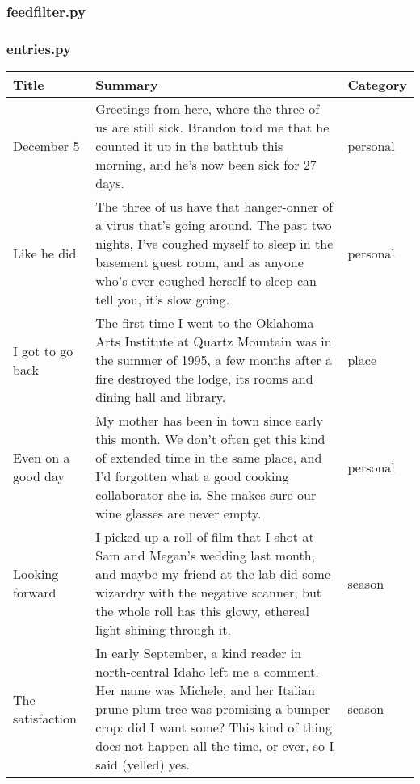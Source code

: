 \documentclass[12pt]{article}
\begin{document}
\subsubsection{feedfilter.py}

\newpage
\subsubsection{entries.py}


\newpage

\begin{longtable}{ | p{3.0cm} | p{12.0cm} |p{2.0cm}| }\hline
\textbf{Title} & \textbf{Summary} & \textbf{Category} \\\hline
 December 5 & Greetings from here, where the three of us are still sick.  Brandon told me that he counted it up in the bathtub this morning, and he’s now been sick for 27 days. & personal\\\hline
 
Like he did & The three of us have that hanger-onner of a virus that’s going around. The past two nights, I’ve coughed myself to sleep in the basement guest room, and as anyone who’s ever coughed herself to sleep can tell you, it’s slow going. & personal \\\hline

I got to go back &The first time I went to the Oklahoma Arts Institute at Quartz Mountain was in the summer of 1995, a few months after a fire destroyed the lodge, its rooms and dining hall and library.  & place \\\hline

Even on a good day & My mother has been in town since early this month. We don’t often get this kind of extended time in the same place, and I’d forgotten what a good cooking collaborator she is. She makes sure our wine glasses are never empty.  & personal  \\\hline 

Looking forward & I picked up a roll of film that I shot at Sam and Megan’s wedding last month, and maybe my friend at the lab did some wizardry with the negative scanner, but the whole roll has this glowy, ethereal light shining through it. &  season \\\hline

The satisfaction &In early September, a kind reader in north-central Idaho left me a comment. Her name was Michele, and her Italian prune plum tree was promising a bumper crop: did I want some? This kind of thing does not happen all the time, or ever, so I said (yelled) yes.  &  season \\\hline


\end{longtable}
\end{document}
